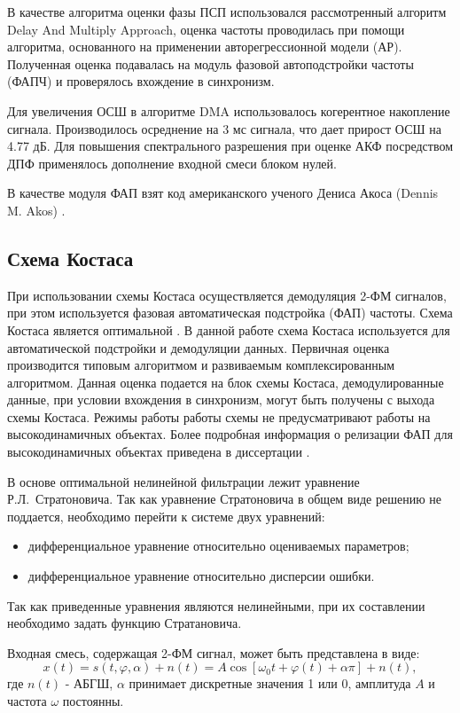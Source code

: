 В качестве алгоритма оценки фазы ПСП использовался
рассмотренный алгоритм Delay And Multiply Approach, оценка частоты проводилась при помощи алгоритма, основанного на применении авторегрессионной модели (АР).
Полученная оценка подавалась на модуль фазовой автоподстройки частоты (ФАПЧ) и проверялось вхождение в синхронизм.

Для увеличения ОСШ в алгоритме DMA использовалось когерентное накопление сигнала. Производилось осреднение на 3 мс сигнала, что дает прирост ОСШ на 4.77 дБ.
Для повышения спектрального разрешения при оценке АКФ посредством ДПФ применялось дополнение входной смеси блоком нулей.

В качестве модуля ФАП взят код американского ученого Дениса Акоса (Dennis M. Akos) \cite{sandiaproject}.
\subsection{Схема Костаса}

При использовании схемы Костаса осуществляется демодуляция 2-ФМ сигналов, при этом используется фазовая автоматическая подстройка (ФАП) частоты. Схема
Костаса является оптимальной \cite{shahtarin-wiener-kalman}. В данной работе схема Костаса используется для автоматической подстройки и демодуляции данных. Первичная
оценка производится типовым алгоритмом и развиваемым комплексированным алгоритмом. Данная оценка подается на блок схемы Костаса, демодулированные данные, при условии
вхождения в синхронизм, могут быть получены с выхода схемы Костаса. Режимы работы работы схемы не предусматривают работы на высокодинамичных объектах. Более
подробная информация о релизации ФАП для высокодинамичных объектах приведена в диссертации \cite{fomenko_phd}.

В основе оптимальной нелинейной фильтрации лежит уравнение \mbox{Р.Л. Стратоновича}. Так как уравнение Стратоновича в общем виде решению не поддается, необходимо
перейти к системе двух уравнений:
\begin{itemize}
	\item дифференциальное уравнение относительно оцениваемых параметров;
	\item дифференциальное уравнение относительно дисперсии ошибки.
\end{itemize}

Так как приведенные уравнения являются нелинейными, при их составлении необходимо задать функцию Стратановича.

Входная смесь, содержащая 2-ФМ сигнал, может быть представлена в виде:
\begin{equation}
	x(t) = s(t, \varphi, \alpha) + n(t) = A \cos \left[ \omega_0t + \varphi(t) +\alpha \pi \right] + n(t),
	\label{eq:sec4_sig}
\end{equation}
где ${n(t)}$ - АБГШ, ${\alpha}$ принимает дискретные значения 1 или 0, амплитуда ${A}$ и частота ${\omega}$ постоянны.

